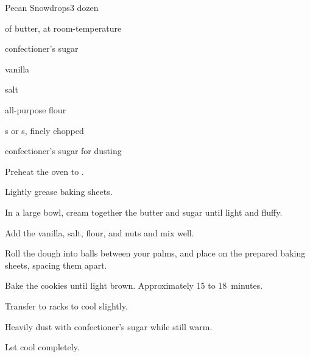\begin{recipe}{Pecan Snowdrops}{}{3 dozen}

\begin{ingredients}
\item \C{\threequarter} of butter, at room-temperature
\item \C{\third} confectioner's sugar
\item {} vanilla
\item \tp{\eighth} salt
\item \C{1 \half} all-purpose flour
\item \C{\threequarter}  s or s, finely chopped
\item confectioner's sugar for dusting
\end{ingredients}

\begin{directions}
\item Preheat the oven to .
\item Lightly grease baking sheets.
\item In a large bowl, cream together the butter and sugar until light and fluffy.
\item Add the vanilla, salt, flour, and nuts and mix well.
\item Roll the dough into \inch{\threequarter} balls between your palms, and place on the prepared baking sheets, spacing them \inch{1 \half} apart.
\item Bake the cookies until light brown. Approximately 15 to 18~minutes.
\item Transfer to racks to cool slightly.
\item Heavily dust with confectioner's sugar while still warm.
\item Let cool completely.
\end{directions}

\end{recipe}

